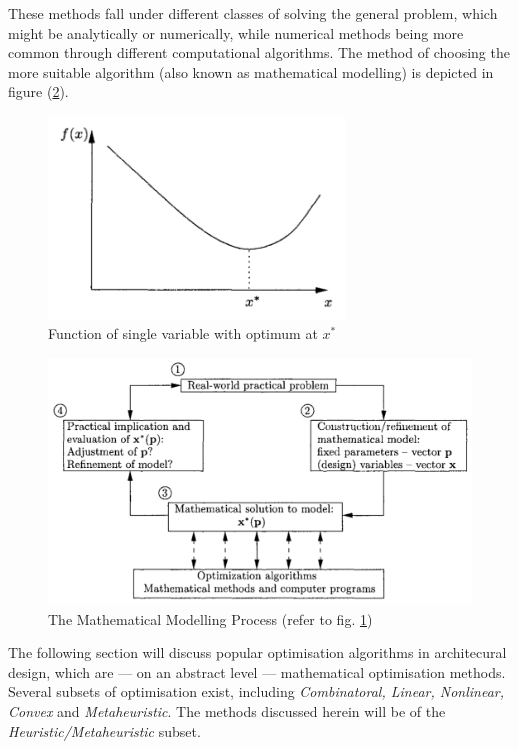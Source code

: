 These methods fall under different classes of solving the general problem, which might be analytically or numerically, while numerical methods being more common through different computational algorithms. The method of choosing the more suitable algorithm (also known as mathematical modelling) is depicted in figure (\ref{fig:MathModProc}).

\begin{figure}[htbp]
\centering
\includegraphics[width=0.7\textwidth]{./Images/19-FunctionOpt}
\caption[Function of Single Variable]{Function of single variable with optimum at $x^*$ \cite{snyman05}}
\label{fig:FunctionOpt}
\end{figure}

\begin{figure}
\centering
\includegraphics[width=\textheight]{./Images/18-MathModProc}
\caption[Mathematical Modelling]{The Mathematical Modelling Process (refer to fig. \ref{fig:FunctionOpt}) \cite{snyman05}}
\label{fig:MathModProc}
\end{figure}

The following section will discuss popular optimisation algorithms in architecural design, which are --- on an abstract level --- mathematical optimisation methods. Several subsets of optimisation exist, including \emph{Combinatoral, Linear, Nonlinear, Convex} and \emph{Metaheuristic}. The methods discussed herein will be of the \emph{Heuristic/Metaheuristic} subset.

